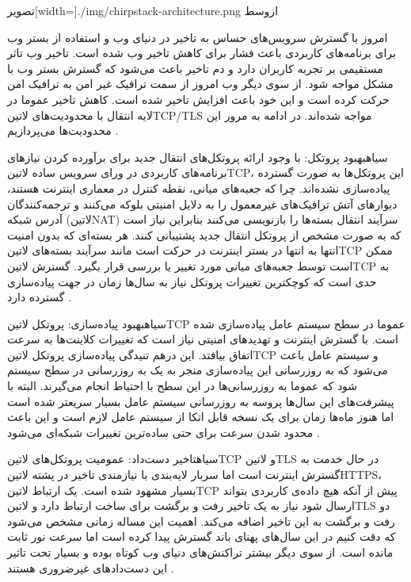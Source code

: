 ‌تصویر[width=\textwidth]{./img/chirpstack-architecture.png}
‌ازوسط


امروز با گسترش سرویس‌های حساس به تاخیر در دنیای وب و استفاده از بستر وب برای برنامه‌های کاربردی باعث فشار برای کاهش تاخیر وب شده است. تاخیر وب تاثر مستقیمی بر تجربه کاربران دارد
و دم تاخیر باعث می‌شود که گسترش بستر وب با مشکل مواجه شود.
از سوی دیگر وب امروز از سمت ترافیک غیر امن به ترافیک امن حرکت کرده است و این خود باعث افزایش تاخیر شده است.
کاهش تاخیر عموما در لایه انتقال با محدودیت‌های ‌لاتین{TCP/TLS} مواجه شده‌اند. در ادامه به مرور این محدودیت‌ها می‌پردازیم
.

‌سیاه{بهبود پروتکل}: با وجود ارائه پروتکل‌های انتقال جدید برای برآورده کردن نیازهای برنامه‌های کاربردی در ورای سرویس ساده ‌لاتین{TCP}، این پروتکل‌ها به صورت گسترده پیاده‌سازی نشده‌اند.
چرا که جعبه‌های میانی، نقطه کنترل در معماری اینترنت هستند، دیوارهای آتش ترافیک‌های غیرمعمول را به دلایل امنیتی بلوکه می‌کنند و ترجمه‌کنندگان آدرس شبکه (‌لاتین{NAT})
سرآیند انتقال بسته‌ها را بازنویسی می‌کنند بنابراین نیاز است که به صورت مشخص از پروتکل انتقال جدید پشتیبانی کنند.
هر بسته‌ای که بدون امنیت انتها به انتها در بستر اینترنت در حرکت است مانند سرآیند بسته‌های ‌لاتین{TCP} ممکن است توسط جعبه‌های میانی مورد تغییر یا بررسی قرار بگیرد.
گسترش ‌لاتین{TCP} به حدی است که کوچکترین تغییرات پروتکل نیاز به سال‌ها زمان در جهت پیاده‌سازی گسترده دارد
.

‌سیاه{بهبود پیاده‌سازی}: پروتکل ‌لاتین{TCP} عموما در سطح سیستم عامل پیاده‌سازی شده است. با گسترش اینترنت و تهدیدهای امنیتی نیاز است که تغییرات کلاینت‌ها به سرعت اتفاق بیافتد.
این درهم تنیدگی پیاده‌سازی پروتکل ‌لاتین{TCP} و سیستم عامل باعث می‌شود که به روزرسانی این پیاده‌سازی منجر به یک به روزرسانی در سطح سیستم شود که عموما به روزرسانی‌ها در این سطح
با احتیاط انجام می‌گیرند. البته با پیشرفت‌های این سال‌ها پروسه به روزرسانی سیستم عامل بسیار سریعتر شده است اما هنوز ماه‌ها زمان برای یک نسخه قابل اتکا از سیستم عامل لازم است و این باعث
محدود شدن سرعت برای حتی ساده‌ترین تغییرات شبکه‌ای می‌شود
.

‌سیاه{تاخیر دست‌داد}: عمومیت پروتکل‌های ‌لاتین{TCP} و ‌لاتین{TLS} در حال خدمت به گسترش اینترنت است اما سربار لایه‌بندی با نیازمندی تاخیر در پشته ‌لاتین{HTTPS}،
بسیار مشهود شده است. یک ارتباط ‌لاتین{TCP} پیش از آنکه هیچ داده‌ی کاربردی بتواند ارسال شود نیاز به یک تاخیر رفت و برگشت برای ساخت ارتباط دارد و ‌لاتین{TLS} دو رفت و برگشت
به این تاخیر اضافه می‌کند. اهمیت این مساله زمانی مشخص می‌شود که دقت کنیم در این سال‌های پهنای باند گسترش پیدا کرده است اما سرعت نور ثابت مانده است. از سوی دیگر بیشتر تراکنش‌های دنیای وب
کوتاه بوده و بسیار تحت تاثیر این دست‌دادهای غیرضروری هستند
.

